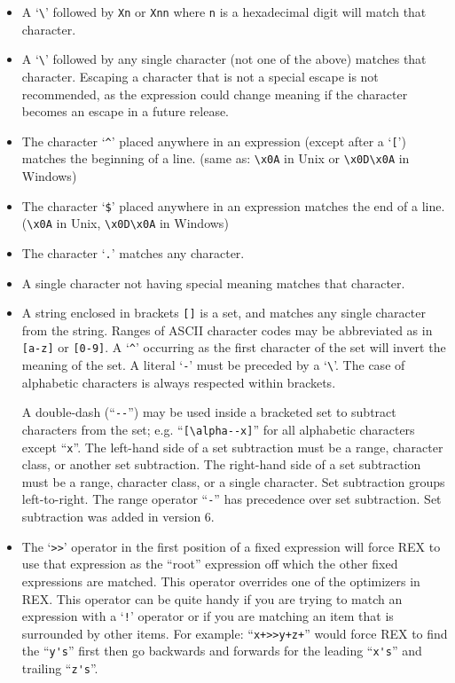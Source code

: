 \begin{itemize}
\item  A `\verb`\`' followed by \verb`Xn` or \verb`Xnn` where \verb`n` is a
       hexadecimal digit will match that character.

\item  A `\verb`\`' followed by any single character (not one of the
       above) matches that character.  Escaping a character that is
       not a special escape is not recommended, as the expression
       could change meaning if the character becomes an escape in a
       future release.

\item  The character `\verb`^`' placed anywhere in an expression (except after a
       `\verb`[`') matches the beginning of a line. (same as: \verb`\x0A` in Unix or
       \verb`\x0D\x0A` in Windows)

\item  The character `\verb`$`' placed anywhere in an expression
       matches the end of a line. (\verb`\x0A` in Unix, \verb`\x0D\x0A` in Windows)

\item  The character `\verb`.`' matches any character.

\item  A single character not having special meaning matches that character.

\item  A string enclosed in brackets \verb`[]` is a set, and matches
       any single character from the string.
       Ranges of ASCII character codes may be
       abbreviated as in \verb`[a-z]` or \verb`[0-9]`.  A `\verb`^`'
       occurring as the first character of the set will invert the
       meaning of the set.  A literal `\verb`-`' must be preceded by a
       `\verb`\`'.  The case of alphabetic characters is always respected
       within brackets.

       A double-dash (``\verb`--`'') may be used inside a bracketed set
       to subtract characters from the set; e.g. ``\verb`[\alpha--x]`''
       for all alphabetic characters except ``\verb`x`''.  The
       left-hand side of a set subtraction must be a range, character
       class, or another set subtraction.  The right-hand side of a set
       subtraction must be a range, character class, or a single
       character.  Set subtraction groups left-to-right.  The range
       operator ``\verb`-`'' has precedence over set subtraction.
       Set subtraction was added in version 6.

\item   The `\verb`>>`' operator in the first position of a fixed expression
        will force REX to use that expression as the ``root'' expression
        off which the other fixed expressions are matched. This operator
        overrides one of the optimizers in REX. This operator can
        be quite handy if you are trying to match an expression
        with a `\verb`!`' operator or if you are matching an item that
        is surrounded by other items. For example: ``\verb`x+>>y+z+`''
        would force REX to find the ``\verb`y's`'' first then go
        backwards and forwards for the leading ``\verb`x's`'' and trailing
        ``\verb`z's`''.


\end{itemize}
